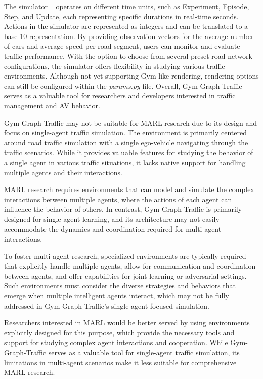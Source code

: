 The simulator ~ operates on different time units, such as Experiment, Episode, Step, and Update, each representing specific durations in real-time seconds. Actions in the simulator are represented as integers and can be translated to a base 10 representation. By providing observation vectors for the average number of cars and average speed per road segment, users can monitor and evaluate traffic performance. With the option to choose from several preset road network configurations, the simulator offers flexibility in studying various traffic environments. Although not yet supporting Gym-like rendering, rendering options can still be configured within the \emph{params.py} file. Overall, Gym-Graph-Traffic serves as a valuable tool for researchers and developers interested in traffic management and AV behavior.

Gym-Graph-Traffic may not be suitable for MARL research due to its design and focus on single-agent traffic simulation. The environment is primarily centered around road traffic simulation with a single ego-vehicle navigating through the traffic scenarios. While it provides valuable features for studying the behavior of a single agent in various traffic situations, it lacks native support for handling multiple agents and their interactions.

MARL research requires environments that can model and simulate the complex interactions between multiple agents, where the actions of each agent can influence the behavior of others. In contrast, Gym-Graph-Traffic is primarily designed for single-agent learning, and its architecture may not easily accommodate the dynamics and coordination required for multi-agent interactions.

To foster multi-agent research, specialized environments are typically required that explicitly handle multiple agents, allow for communication and coordination between agents, and offer capabilities for joint learning or adversarial settings. Such environments must consider the diverse strategies and behaviors that emerge when multiple intelligent agents interact, which may not be fully addressed in Gym-Graph-Traffic's single-agent-focused simulation.

Researchers interested in MARL would be better served by using environments explicitly designed for this purpose, which provide the necessary tools and support for studying complex agent interactions and cooperation. While Gym-Graph-Traffic serves as a valuable tool for single-agent traffic simulation, its limitations in multi-agent scenarios make it less suitable for comprehensive MARL research.

